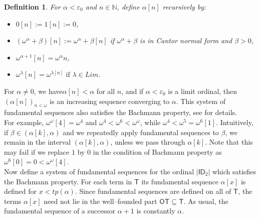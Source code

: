 \documentclass{amsart}
\theoremstyle{plain}
\theoremstyle{plain}
\newtheorem*{definition}{Definition}
\newcommand\T{\mathsf{T}}
\newcommand\OT{\mathsf{OT}}
\newcommand{\ID}{\mathsf{ID}}
\newcommand{\al}{{\alpha}}
\newcommand{\be}{{\beta}}
\newcommand{\la}{\lambda}
\newcommand{\om}{\omega}
\newcommand\Nat{\mathbb{N}}
\begin{document}
\begin{definition}
    For $\al<\varepsilon_0$ and $n\in \Nat$, define $\al[n]$ recursively by:
    \begin{itemize}
        \item $0[n]:=1[n]:=0$,
        \item $(\om^\al+\be)[n]:=\om^\al+\be[n]$ if $\om^\al+\be$  is in Cantor normal form and $\be>0$,
        \item $\om^{\al+1}[n] = \om^\al n$,
        \item $\om^\la[n] = \om^{\la[n]} \text{ if } \la \in Lim.$
        \end{itemize}
\end{definition}
For $\al\neq 0$, we have$\al[n] <\al$  for all $n$, and if  $\al<\varepsilon_0$ is a limit ordinal, then $(\al[n])_{n<\om}$  is an increasing sequence converging to $\al$. This system of fundamental sequences also satisfies the Bachmann property, see \cite{Schmidt1977,Weiermann2006} for details.\medskip
\\
For example, $\om^\om[4] = \om^4$ and $\om^4 < \om^6 < \om^\om$, while $\om^4 < \om^5 = \om^6[1]$.
Intuitively, if $\be \in (\al[k], \al)$ and we repeatedly apply fundamental sequences to $\be$, we remain in the interval $(\al[k], \al)$, unless we pass through $\al[k]$. Note that this may fail if we replace $1$ by $0$ in the condition of Bachmann property as $\om^6[0] = 0 < \om^\om[4]$.\medskip\\


Now define a system of fundamental sequences for the ordinal $|\ID_2|$ which satisfies the Bachmann property.
For each term in $\T$ its fundamental sequence $\al[x]$ is defined for $x<tp(\al)$. 
Since fundamental sequences are defined on all of $\T$, the terms $\alpha[x]$ need not lie in the well–founded part $\OT \subseteq \T$. As usual, the fundamental sequence of a successor $\alpha+1$ is constantly $\alpha$.
\end{document}
